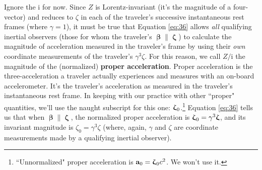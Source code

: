 \documentclass[12pt]{article}
\renewcommand{\vv}[1]{\mathbf{#1}}
\newcommand{\vvbeta}{\bm{\upbeta}}
\newcommand{\vvzeta}{\bm{\upzeta}}
\begin{document}
Ignore the $\mathrm{i}$ for now. Since $Z$ is Lorentz-invariant (it's the magnitude of a four-vector) and reduces to $\zeta$ in each of the traveler's successive instantaneous rest frames (where $\gamma = 1$), it must be true that Equation \ref{eq:36} allows \emph{all} qualifying inertial observers (those for whom the traveler's $\vvbeta \parallel \vvzeta$) to calculate the magnitude of acceleration measured in the traveler's frame by using their \emph{own} coordinate measurements of the traveler's $\gamma^3 \zeta$. For this reason, we call $Z / \mathrm{i}$ the magnitude of the (normalized) \textbf{proper acceleration}. Proper acceleration is the three-acceleration a traveler actually experiences and measures with an on-board accelerometer. It's the traveler's acceleration as measured in the traveler's instantaneous rest frame. In keeping with our practice with other ``proper" quantities, we'll use the naught subscript for this one: $\vvzeta_{\mkern1mu 0}$.\footnote{``Unnormalized" proper acceleration is $\vv a_0 = \vvzeta_{\mkern1mu 0} c^2$. We won't use it.} Equation \ref{eq:36} tells us that when $\vvbeta \parallel \vvzeta$, the normalized proper acceleration is $\vvzeta_{\mkern1mu 0} = \gamma^3 \vvzeta$, and its invariant magnitude is $\zeta_0 = \gamma^3 \zeta$ (where, again, $\gamma$ and $\zeta$ are coordinate measurements made by a qualifying inertial observer).
\end{document}
